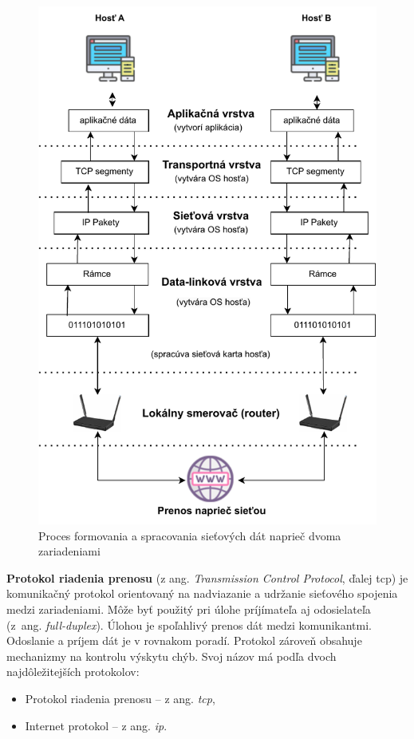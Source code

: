 \begin{figure}[!h]
	\centering
	\includegraphics[width=0.8\linewidth]{figures/prenos1z2}
	\caption{Proces formovania a spracovania sieťových dát naprieč dvoma zariadeniami}
	\label{p1}
\end{figure}

\newpage
\textbf{Protokol riadenia prenosu} (z ang. \textit{Transmission Control Protocol}, ďalej \acrshort{tcp}) je komunikačný protokol orientovaný na nadviazanie a udržanie sieťového spojenia medzi zariadeniami. Môže byť použitý pri úlohe príjímateľa aj odosielateľa (z~ang. \textit{full-duplex}). Úlohou je spoľahlivý prenos dát medzi komunikantmi. Odoslanie a príjem dát je v rovnakom poradí. Protokol zároveň obsahuje mechanizmy na kontrolu výskytu chýb. Svoj názov má podľa dvoch najdôležitejších protokolov:
\begin{itemize}
	\item{Protokol riadenia prenosu} -- z ang. \textit{\acrlong{tcp}},
	\item{Internet protokol} -- z ang. \textit{\acrlong{ip}}. 
\end{itemize}

